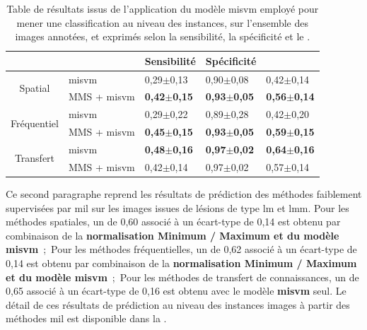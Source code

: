 \begin{table}[H]
    \centering
    \begin{tabular}{cllll}
        \toprule
        \multicolumn{1}{l}{}         &                      & Sensibilité               & Spécificité               & \Fscore{}                 \\ \midrule
        \multirow{2}{*}{Spatial}     & \gls{misvm}          & 0,29$\pm$0,13             & 0,90$\pm$0,08             & 0,42$\pm$0,14             \\
                                     & MMS + \gls{misvm}    & \textbf{0,42$\pm$0,15}    & \textbf{0,93$\pm$0,05}    & \textbf{0,56$\pm$0,14}    \\ \midrule
        \multirow{2}{*}{Fréquentiel} & \gls{misvm}          & 0,29$\pm$0,22             & 0,89$\pm$0,28             & 0,42$\pm$0,20             \\
                                     & MMS + \gls{misvm}    & \textbf{0,45$\pm$0,15}    & \textbf{0,93$\pm$0,05}    & \textbf{0,59$\pm$0,15}    \\ \midrule
        \multirow{2}{*}{Transfert}   & \gls{misvm}          & \textbf{0,48$\pm$0,16}    & \textbf{0,97$\pm$0,02}    & \textbf{0,64$\pm$0,16}    \\
                                     & MMS + \gls{misvm}    & 0,42$\pm$0,14             & 0,97$\pm$0,02             & 0,57$\pm$0,14             \\ \bottomrule
    \end{tabular}
    \caption{Table de résultats issus de l'application du modèle \gls{misvm} employé pour mener une classification au niveau des instances, sur l'ensemble des images annotées, et exprimés selon la sensibilité, la spécificité et le \fscore{}.}
    \label{tab:results_lesion_classification_weakly_image}
\end{table}

Ce second paragraphe reprend les résultats de prédiction des méthodes faiblement supervisées par \gls{mil} sur les images issues de lésions de type \gls{lm} et \gls{lmm}. Pour les méthodes spatiales, un \fscore{} de 0,60 associé à un écart-type de 0,14 est obtenu par combinaison de la \textbf{normalisation Minimum / Maximum et du modèle \gls{misvm}}~;~Pour les méthodes fréquentielles, un \fscore{} de 0,62 associé à un écart-type de 0,14 est obtenu par combinaison de la \textbf{normalisation Minimum / Maximum et du modèle \gls{misvm}}~;~Pour les méthodes de transfert de connaissances, un \fscore{} de 0,65 associé à un écart-type de 0,16 est obtenu avec le modèle \textbf{\gls{misvm}} seul. Le détail de ces résultats de prédiction au niveau des instances images à partir des méthodes \gls{mil} est disponible dans la .\par

